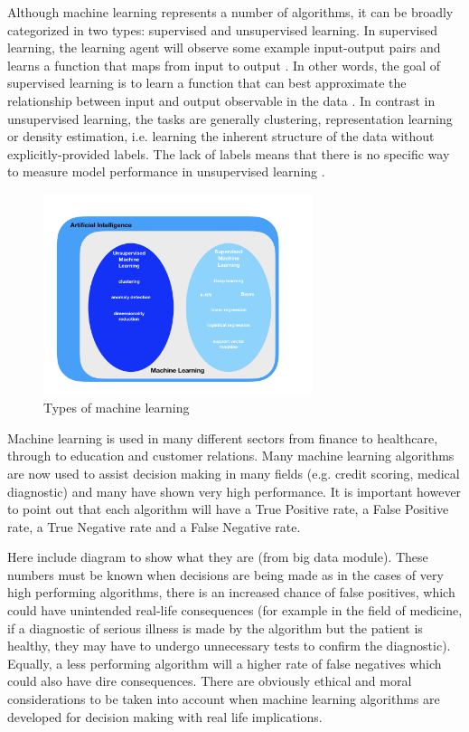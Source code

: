 Although machine learning represents a number of algorithms, it can be broadly categorized in two types: supervised and unsupervised learning. In supervised learning, the learning agent will observe some example input-output pairs and learns a function that maps from input to output \citep{Russell:2016tz}. In other words, the goal of supervised learning is to learn a function that can best approximate the relationship between input and output observable in the data \citep{Mullainathan:uy}. 
In contrast in unsupervised learning, the tasks are generally clustering, representation learning or density estimation, i.e. learning the inherent structure of the data without explicitly-provided labels. The lack of labels means that there is no specific way to measure model performance in unsupervised learning \citep{Soni:tr}.

\begin{figure}[h]
\caption{Types of machine learning}
\centering
\includegraphics[width=0.7\textwidth]{ThesisTemplate/usingLatex/images/Figure1.png}
\end{figure}



Machine learning is used in many different sectors from finance to healthcare, through to education and customer relations. Many machine learning algorithms are now used to assist decision making in many fields (e.g. credit scoring, medical diagnostic) and many have shown very high performance. It is important however to point out that each algorithm will have a True Positive rate, a False Positive rate, a True Negative rate and a False Negative rate.

Here include diagram to show what they are (from big data module). 
These numbers must be known when decisions are being made as in the cases of very high performing algorithms, there is an increased chance of false positives, which could have unintended real-life consequences (for example in the field of medicine, if a diagnostic of serious illness is made by the algorithm but the patient is healthy, they may have to undergo unnecessary tests to confirm the diagnostic). Equally, a less performing algorithm will a higher rate of false negatives which could also have dire consequences. There are obviously ethical and moral considerations to be taken into account when machine learning algorithms are developed for decision making with real life implications. 



